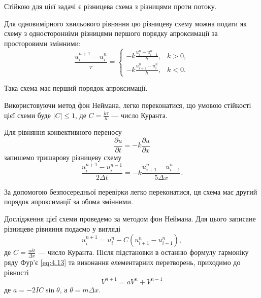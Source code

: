 \begin{proposition}
    Стійкою для цієї задачі є різницева схема з різницями проти потоку. 
\end{proposition}

Для одновимірного хвильового рівняння цю різницеву схему можна подати як схему з односторонніми різницями першого порядку апроксимації за просторовими змінними:
\begin{equation*}
    \frac{u_i^{n + 1} - u_i^n}{\tau} = \begin{cases}
        -k \frac{u_i^n - u_{i - 1}^n}{h}, & k > 0, \\
        -k \frac{u_{i + 1}^n - u_i^n}{h}, & k < 0.
    \end{cases}
\end{equation*}

\begin{proposition}
    Така схема має перший порядок апроксимації.
\end{proposition}

Використовуючи метод фон Неймана, легко переконатися, що умовою стійкості цієї схеми буде $|C| \le 1$, де $C = \frac{k \tau}{h}$ --- число Куранта.

\begin{example}
	Для рівняння конвективного переносу
	\begin{equation*}
	    \frac{\partial u}{\partial t} = -k \frac{\partial u}{\partial x}
	\end{equation*}
    запишемо тришарову різницеву схему
	\begin{equation*}
	    \frac{u_i^{n + 1} - u_i^{n - 1}}{2 \Delta t} = - k \frac{u_{i + 1}^n - u_{i - 1}^n}{5\Delta x}.
	\end{equation*}
\end{example}

\begin{proposition}
    За допомогою безпосередньої перевірки легко переконатися, ця схема має другий порядок апроксимації за обома змінними. 
\end{proposition}

Дослідження цієї схеми проведемо за методом фон Неймана. Для цього записане різницеве рівняння подаємо у вигляді
\begin{equation*}
    u_i^{n + 1} = u_i^n - C(u_{i + 1}^n - u_{i - 1}^n),
\end{equation*}
де $C = \frac{u \delta t}{\Delta x}$ --- число Куранта. Після підстановки в останню формулу гармоніку ряду Фур'є \eqref{eq:4.13} та виконання елементарних перетворень, приходимо до рівності
\begin{equation*}
    V^{n + 1} = a V^n + V^{n - 1}
\end{equation*}
де $a = -2IC \sin \theta$, а $\theta = m \Delta x$. \medskip


